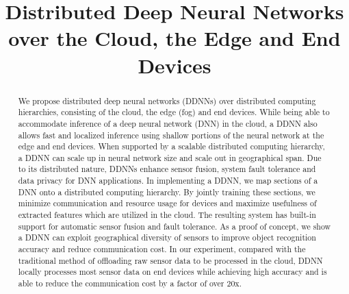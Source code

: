 \documentclass[10pt, conference, compsocconf]{IEEEtran}
\begin{document}
\title{Distributed Deep Neural Networks\\over the Cloud, the Edge and End Devices}

\author{
 \and
 \and
}

\maketitle

\begin{abstract}
We propose distributed deep neural networks (DDNNs) over distributed computing hierarchies, consisting of the cloud, the edge (fog) and end devices. While being able to accommodate inference of a deep neural network (DNN) in the cloud, a DDNN also allows fast and localized inference using shallow portions of the neural network at the edge and end devices. When supported by a scalable distributed computing hierarchy, a DDNN can scale up in neural network size and scale out in geographical span. Due to its distributed nature, DDNNs enhance sensor fusion, system fault tolerance and data privacy for DNN applications.  In implementing a DDNN, we map sections of a DNN onto a distributed computing hierarchy. By jointly training these sections, we minimize communication and resource usage for devices and maximize usefulness of extracted features which are utilized in the cloud. The resulting system has built-in support for automatic sensor fusion and fault tolerance. As a proof of concept, we show a DDNN can exploit geographical diversity of sensors to improve object recognition accuracy and reduce communication cost. In our experiment, compared with the traditional method of offloading raw sensor data to be processed in the cloud, DDNN locally processes most sensor data on end devices while achieving high accuracy and is able to reduce the communication cost by a factor of over 20x.
\end{abstract}
\end{document}
